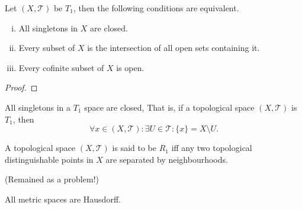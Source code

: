 


\begin{proposition}
	\label{prop: alternative definitions of T_1 spaces}
	Let $(X, \mathcal T)$ be $T_1$, then the following conditions are equivalent.
	\begin{enumerate}[(i)]
		\item All singletons in $X$ are closed.
		\item Every subset of $X$ is the intersection of all open sets containing it.
		\item Every cofinite subset of $X$ is open.
	\end{enumerate}
	
	\begin{proof}
		
	\end{proof}
\end{proposition}


\begin{proposition}
	\label{prop: all singletons in a T_1 space are closed}
	
	All singletons in a $T_1$ space are closed, That is, if a topological space $(X, \mathcal T)$ is $T_1$, then
	$$
	\forall x \in (X, \mathcal T) : \exists U \in \mathcal T : \{x\} = X \setminus U.
	$$
\end{proposition}


\begin{definition}
	[$R_1$ spaces]
	\label{def: R_1 spaces}
	A topological space $(X, \mathcal T)$ is said to be $R_1$ iff any two topological distinguishable points in $X$ are separated by neighbourhoods.
\end{definition}


\begin{example}
	\label{eg: R_0 but not R_1}
	(Remained as a problem!)
\end{example}




\begin{proposition}
	All metric spaces are Hausdorff.
\end{proposition}


